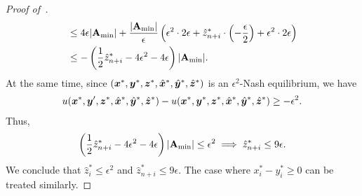 \begin{proof}[Proof of~]
\begin{align*}
        &\leq 4\epsilon |\mathbf{A}_{\min}| + \frac{|\mathbf{A}_{\min}|}{\epsilon}\left(\epsilon^2 \cdot 2\epsilon + \hat{z}^*_{n + i} \cdot \left(- \frac{\epsilon}{2} \right) + \epsilon^2 \cdot 2\epsilon \right) \\
        &\leq -\left(\frac{1}{2}\hat{z}^*_{n +i} - 4 \epsilon^2 - 4\epsilon\right) |\mathbf{A}_{\min}|.
    \end{align*}
    At the same time, since $({\bm{x}}^*, {\bm{y}}^*, {\bm{z}}^*, \hat{{\bm{x}}}^*, \hat{{\bm{y}}}^*, \hat{{\bm{z}}}^*)$ is an $\epsilon^2$-Nash equilibrium, we have
    \begin{align*}
        u({\bm{x}}^*, {\bm{y}}', {\bm{z}}^*, \hat{{\bm{x}}}^*, \hat{{\bm{y}}}^*, \hat{{\bm{z}}}^*) - u({\bm{x}}^*, {\bm{y}}^*, {\bm{z}}^*, \hat{{\bm{x}}}^*, \hat{{\bm{y}}}^*, \hat{{\bm{z}}}^*) \geq - \epsilon^2.
    \end{align*}
    Thus,
    \begin{equation*}
        \left(\frac{1}{2}\hat{z}^*_{n +i} - 4 \epsilon^2 -4\epsilon\right) |\mathbf{A}_{\min}| \leq \epsilon^2 \implies \hat{z}^*_{n +i} \leq 9 \epsilon.
    \end{equation*}
    We conclude that $\hat{z}^*_i \leq \epsilon^2$ and $\hat{z}^*_{n + i} \leq 9\epsilon$. The case where $x_i^* - y_i^* \geq 0$ can be treated similarly.
\end{proof}

